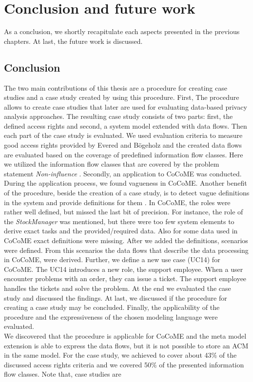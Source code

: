 
\chapter{Conclusion and future work}
\label{ch:Conclusion}
As a conclusion, we shortly recapitulate each aspects presented in the previous chapters. At last, the future work is discussed.
\section{Conclusion}
The two main contributions of this thesis are a procedure for creating case studies and a case study created by using this procedure. First, The procedure allows to create case studies that later are used for evaluating data-based privacy analysis approaches. The resulting case study consists of two parts: first, the defined access rights and second, a system model extended with data flows. Then each part of the case study is evaluated. We used evaluation criteria to measure good access rights provided by Evered and Bögeholz \cite{CaseStudyAndAccessrigths} and the created data flows are evaluated based on the coverage of predefined information flow classes. Here we utilized the information flow classes that are covered by the problem statement \textit{Non-influence} \cite{NonInfluence}. Secondly, an application to CoCoME was conducted. During the application process, we found vagueness in CoCoME. Another benefit of the procedure, beside the creation of a case study, is to detect vague definitions in the system and provide definitions for them . In CoCoME, the roles were rather well defined, but missed the last bit of precision. For instance, the role of the \textit{StockManager} was mentioned, but there were too few system elements to derive exact tasks and the provided/required data. Also for some data used in CoCoME exact definitions were missing. After we added the definitions, scenarios were defined. From this scenarios the data flows that describe the data processing in CoCoME, were derived. Further, we define a new use case (UC14) for CoCoME. The UC14 introduces a new role, the support employee. When a user encounter problems with an order, they can issue a ticket. The support employee handles the tickets and solve the problem. At the end we evaluated the case study and discussed the findings. At last, we discussed if the procedure for creating a case study may be concluded. Finally, the applicability of the procedure and the expressiveness of the chosen modeling language were evaluated.\\ We discovered that the procedure is applicable for CoCoME and the meta model extension is able to express the data flows, but it is not possible to store an ACM in the same model. For the case study, we achieved to cover about 43\% of the discussed access rights criteria and we covered 50\% of the presented information flow classes. Note that, case studies are 